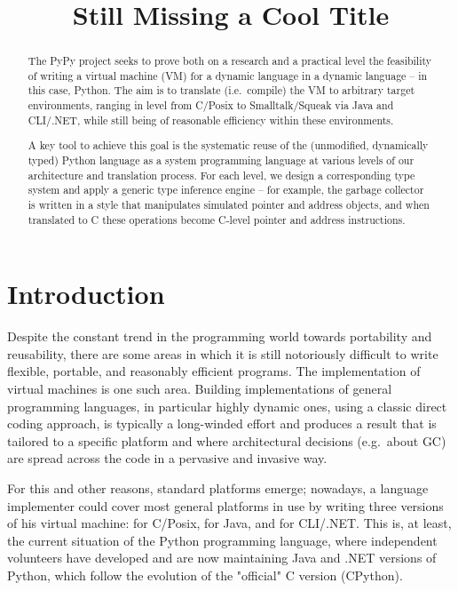 \documentclass{acm_proc_article-sp}
\begin{document}
\title{Still Missing a Cool Title}


\maketitle

\begin{abstract}
The PyPy project seeks to prove both on a research and a
practical level the feasibility of writing a virtual machine (VM)
for a dynamic language in a dynamic language -- in this case, Python.
The aim is to translate (i.e.\ compile) the VM to arbitrary target
environments, ranging in level from C/Posix to Smalltalk/Squeak via
Java and CLI/.NET, while still being of reasonable efficiency within
these environments.

A key tool to achieve this goal is the systematic reuse of the
(unmodified, dynamically typed) Python language as a system
programming language at various levels of our architecture and
translation process.  For each level, we design a corresponding type
system and apply a generic type inference engine -- for example, the
garbage collector is written in a style that manipulates
simulated pointer and address objects, and when translated to C
these operations become C-level pointer and address instructions.
\end{abstract}

\section{Introduction}

Despite the constant trend in the programming world towards
portability and reusability, there are some areas in which it is still
notoriously difficult to write flexible, portable, and reasonably
efficient programs.  The implementation of virtual machines is one
such area.  Building implementations of general programming languages,
in particular highly dynamic ones, using a classic direct coding
approach, is typically a long-winded effort and produces a result that
is tailored to a specific
platform and where architectural decisions (e.g.\ about GC) are spread
across the code in a pervasive and invasive way.

For this and other reasons, standard platforms emerge; nowadays, a
language implementer could cover most general platforms in use by
writing three versions of his virtual machine: for C/Posix, for Java,
and for CLI/.NET.  This is, at least, the current situation of the
Python programming language, where independent volunteers have
developed and are now maintaining Java and .NET versions of Python,
which follow the evolution of the "official" C version (CPython).
\end{document}
